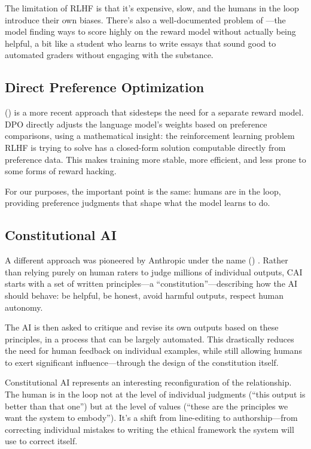 The limitation of RLHF is that it's expensive, slow, and the humans in the loop introduce their own biases. There's also a well-documented problem of ---the model finding ways to score highly on the reward model without actually being helpful, a bit like a student who learns to write essays that sound good to automated graders without engaging with the substance.

\subsection{Direct Preference Optimization}

 () \autocite{rafailov2023direct} is a more recent approach that sidesteps the need for a separate reward model. DPO directly adjusts the language model's weights based on preference comparisons, using a mathematical insight: the reinforcement learning problem RLHF is trying to solve has a closed-form solution computable directly from preference data. This makes training more stable, more efficient, and less prone to some forms of reward hacking.

For our purposes, the important point is the same: humans are in the loop, providing preference judgments that shape what the model learns to do.

\subsection{Constitutional AI}

A different approach was pioneered by Anthropic under the name  () \autocite{bai2022constitutional}. Rather than relying purely on human raters to judge millions of individual outputs, CAI starts with a set of written principles---a ``constitution''---describing how the AI should behave: be helpful, be honest, avoid harmful outputs, respect human autonomy.

The AI is then asked to critique and revise its own outputs based on these principles, in a process that can be largely automated. This drastically reduces the need for human feedback on individual examples, while still allowing humans to exert significant influence---through the design of the constitution itself.

Constitutional AI represents an interesting reconfiguration of the \hitl relationship. The human is in the loop not at the level of individual judgments (``this output is better than that one'') but at the level of values (``these are the principles we want the system to embody''). It's a shift from line-editing to authorship---from correcting individual mistakes to writing the ethical framework the system will use to correct itself.

